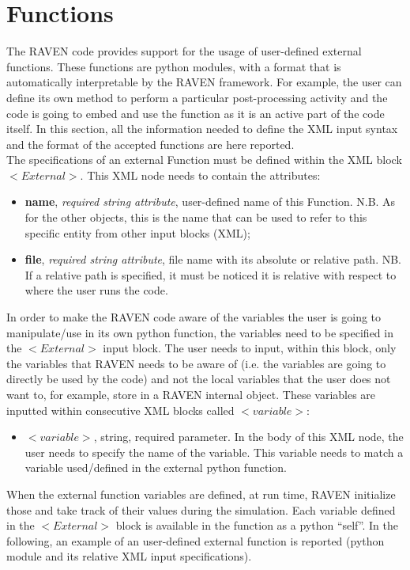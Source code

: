 \section{Functions  \\ \vspace{2 mm} {\small }}
\label{sec:functions}
The RAVEN code provides support for the usage of user-defined external functions. These functions are python modules, with a format that is automatically interpretable by the RAVEN framework. 	For example, the user can define its own method to perform a particular post-processing activity and the code is going to embed and use the function as it is an active part of the code itself. In this section, all the information needed to define the XML input syntax and the format of the accepted functions are here reported.
\\ The specifications of an external Function must be defined within the XML block $<External>$. This XML node needs to contain the attributes:
\vspace{-5mm}
\begin{itemize}
\itemsep0em
\item \textbf{name}, \textit{required string attribute}, user-defined name of this Function. N.B. As for the other objects, this is the name that can be used to refer to this specific entity from other input blocks (XML);
\item \textbf{file}, \textit{required string attribute}, file name with its absolute or relative path. NB. If a relative path is specified, it must be noticed it is relative with respect to where the user runs the code.
\end{itemize}
\vspace{-5mm}
In order to make the RAVEN code aware of the variables the user is going to manipulate/use in its own python function, the variables need to be specified in the \textbf{$<External>$} input block. The user needs to input, within this block, only the variables that RAVEN needs to be aware of (i.e. the variables are going to directly be used by the code) and not the local variables that the user does not want to, for example, store in a RAVEN internal object. These variables are inputted within consecutive XML blocks called $<variable>$:
\begin{itemize}
\item $<variable>$, string, required parameter. In the body of this XML node, the user needs to specify the name of the variable. This variable needs to match a variable used/defined in the external python function.
\end{itemize}
When the external function variables are defined, at run time, RAVEN initialize those and take track of their values during the simulation. Each variable defined in the $<External>$ block is available in the function as a python ``self''. In the following, an example of an user-defined external function is reported (python module and its relative XML input specifications).

